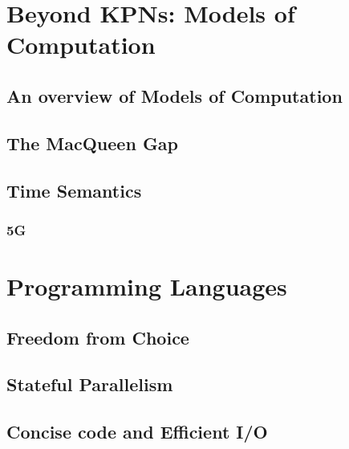 \documentclass[
		twoside,openright,titlepage,numbers=noenddot,headinclude,%
	 	footinclude=true,cleardoublepage=empty,
		dottedtoc, %
		BCOR=5mm,paper=a4,fontsize=10pt, %
		ngerman,american, %
		]{scrreprt}
\begin{document}
%

\chapter{Beyond \acsp{KPN}: Models of Computation}
\label{chap:mocs}

\section{An overview of Models of Computation}
\label{sec:mocs_overview}

\section{The MacQueen Gap} %
\label{sec:macqueen}
\section{Time Semantics}
\label{sec:reactors}
\subsection{5G}
\label{sec:5g}

\chapter{Programming Languages}
\label{chap:pl}

\section{Freedom from Choice}
 
\section{Stateful Parallelism}

\section{Concise code and Efficient \ac{I/O}}
\end{document}
